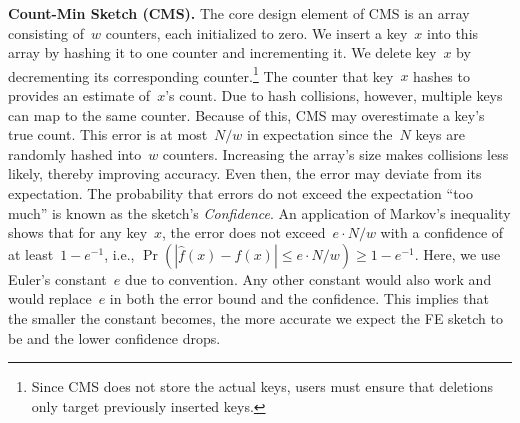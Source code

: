 \documentclass[sigconf]{acmart}
\begin{document}
\textbf{Count-Min Sketch (CMS).}
The core design element of CMS is an array consisting of~$w$ counters, each initialized to zero.
We insert a key~$x$ into this array by hashing it to one counter and incrementing it.
We delete key~$x$ by decrementing its corresponding counter.\footnote{Since CMS does not store the actual keys, users must ensure that deletions only target previously inserted keys.}
The counter that key~$x$ hashes to provides an estimate of~$x$'s count.
Due to hash collisions, however, multiple keys can map to the same counter.
Because of this, CMS may overestimate a key's true count.
This error is at most~$N/w$ in expectation since the~$N$ keys are randomly hashed into~$w$ counters.
Increasing the array's size makes collisions less likely, thereby improving accuracy.
Even then, the error may deviate from its expectation. 
The probability that errors do not exceed the expectation ``too much'' is known as the sketch's \emph{Confidence}.
An application of Markov's inequality shows that for any key~$x$, the error does not exceed~$e \cdot N/w$ with a confidence of at least~$1-e^{-1}$, i.e., $\Pr(|\hat{f}(x)-f(x)| \leq e \cdot N/w) \geq 1-e^{-1}$.
Here, we use Euler's constant~$e$ due to convention.
Any other constant would also work and would replace~$e$ in both the error bound and the confidence.
This implies that the smaller the constant becomes, the more accurate we expect the FE sketch to be and the lower confidence drops.
\end{document}
